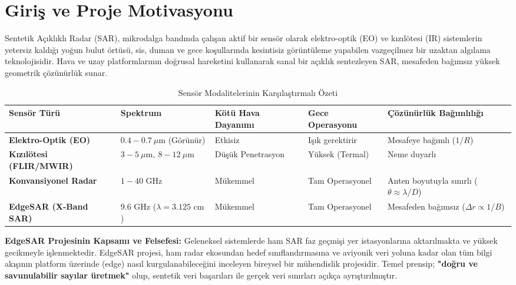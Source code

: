 \documentclass[11pt,a4paper]{article}
\begin{document}
\newpage
{\small\tableofcontents}
\newpage

\section{Giriş ve Proje Motivasyonu}

Sentetik Açıklıklı Radar (SAR), mikrodalga bandında çalışan aktif bir sensör olarak elektro-optik (EO) ve kızılötesi (IR) sistemlerin yetersiz kaldığı yoğun bulut örtüsü, sis, duman ve gece koşullarında kesintisiz görüntüleme yapabilen vazgeçilmez bir uzaktan algılama teknolojisidir. Hava ve uzay platformlarının doğrusal hareketini kullanarak sanal bir açıklık sentezleyen SAR, mesafeden bağımsız yüksek geometrik çözünürlük sunar.

\begin{table}[htbp]
\centering
\small
\caption{Sensör Modalitelerinin Karşılaştırmalı Özeti}
\label{tab:sensor_comparison}
\begin{tabularx}{\textwidth}{>{\bfseries}p{3.2cm} p{2.6cm} >{\raggedright\arraybackslash}p{2.6cm} >{\raggedright\arraybackslash}p{2.4cm} >{\raggedright\arraybackslash}X}
\toprule
Sensör Türü & Spektrum & Kötü Hava Dayanımı & Gece Operasyonu & Çözünürlük Bağımlılığı \\
\midrule
Elektro-Optik (EO) & $0.4 - 0.7\ \mu\text{m}$ (Görünür) & Etkisiz & Işık gerektirir & Mesafeye bağımlı ($1/R$) \\
Kızılötesi (FLIR/MWIR) & $3 - 5\ \mu\text{m},\ 8 - 12\ \mu\text{m}$ & Düşük Penetrasyon & Yüksek (Termal) & Neme duyarlı \\
Konvansiyonel Radar & $1 - 40\text{ GHz}$ & Mükemmel & Tam Operasyonel & Anten boyutuyla sınırlı ($\theta \approx \lambda/D$) \\
EdgeSAR (X-Band SAR) & 9.6 GHz ($\lambda=3.125\text{ cm}$) & Mükemmel & Tam Operasyonel & Mesafeden bağımsız ($\Delta r \propto 1/B$) \\
\bottomrule
\end{tabularx}
\end{table}

\textbf{EdgeSAR Projesinin Kapsamı ve Felsefesi:} Geleneksel sistemlerde ham SAR faz geçmişi yer istasyonlarına aktarılmakta ve yüksek gecikmeyle işlenmektedir. EdgeSAR projesi, ham radar ekosundan hedef sınıflandırmasına ve aviyonik veri yoluna kadar olan tüm bilgi akışının platform üzerinde (edge) nasıl kurgulanabileceğini inceleyen bireysel bir mühendislik projesidir. Temel prensip; \textbf{"doğru ve savunulabilir sayılar üretmek"} olup, sentetik veri başarıları ile gerçek veri sınırları açıkça ayrıştırılmıştır.
\end{document}
